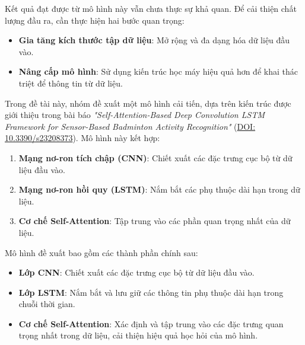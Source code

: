 Kết quả đạt được từ mô hình này vẫn chưa thực sự khả quan. Để cải thiện chất lượng đầu ra, cần thực hiện hai bước quan trọng:
\begin{itemize}
    \item \textbf{Gia tăng kích thước tập dữ liệu}: Mở rộng và đa dạng hóa dữ liệu đầu vào.
    \item \textbf{Nâng cấp mô hình}: Sử dụng kiến trúc học máy hiệu quả hơn để khai thác triệt để thông tin từ dữ liệu.
\end{itemize}

Trong đề tài này, nhóm đề xuất một mô hình cải tiến, dựa trên kiến trúc được giới thiệu trong bài báo \textit{"Self-Attention-Based Deep Convolution LSTM Framework for Sensor-Based Badminton Activity Recognition"} (\href{https://doi.org/10.3390/s23208373}{DOI: 10.3390/s23208373}). Mô hình này kết hợp:
\begin{enumerate}
    \item \textbf{Mạng nơ-ron tích chập (CNN)}: Chiết xuất các đặc trưng cục bộ từ dữ liệu đầu vào.
    \item \textbf{Mạng nơ-ron hồi quy (LSTM)}: Nắm bắt các phụ thuộc dài hạn trong dữ liệu.
    \item \textbf{Cơ chế Self-Attention}: Tập trung vào các phần quan trọng nhất của dữ liệu.
\end{enumerate}

Mô hình đề xuất bao gồm các thành phần chính sau:
\begin{itemize}
    \item \textbf{Lớp CNN}: Chiết xuất các đặc trưng cục bộ từ dữ liệu đầu vào.
    \item \textbf{Lớp LSTM}: Nắm bắt và lưu giữ các thông tin phụ thuộc dài hạn trong chuỗi thời gian.
    \item \textbf{Cơ chế Self-Attention}: Xác định và tập trung vào các đặc trưng quan trọng nhất trong dữ liệu, cải thiện hiệu quả học hỏi của mô hình.
\end{itemize}

